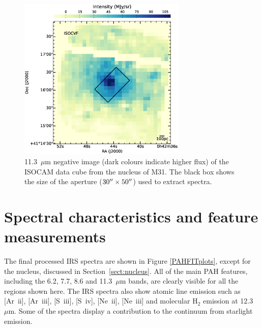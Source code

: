 \documentclass[useAMS,usenatbib,a4paper]{mn2e}
\begin{document}
\begin{figure}
\centering
\includegraphics[width = 8cm]{./fig5.eps}
\caption{11.3~$\mu$m negative image (dark colours indicate higher flux) of the ISOCAM data cube from the nucleus of M31. 
The black box shows the size of the aperture ($30\hbox{$^{\prime\prime}$}\times50\hbox{$^{\prime\prime}$}$) used to extract spectra.}
\label{isonuc}
\end{figure}







\section{Spectral characteristics and feature measurements}
\label{sect:data_analysis}


The final processed IRS spectra are shown in  Figure \ref{PAHFITplots}, except for the nucleus, discussed in Section~\ref{sect:nucleus}.
All of the main PAH features, including the 6.2, 7.7, 8.6 and 11.3~$\mu$m bands, 
are clearly visible for all the regions shown here.
The IRS spectra also show atomic line emission such as [Ar~{\sc ii}], [Ar~{\sc iii}], [S~{\sc iii}], [S~{\sc iv}], [Ne~{\sc ii}], [Ne~{\sc iii}] 
and molecular H$_{2}$ emission at 12.3~$\mu$m. Some of the spectra display a contribution to the continuum from starlight emission.
\end{document}
